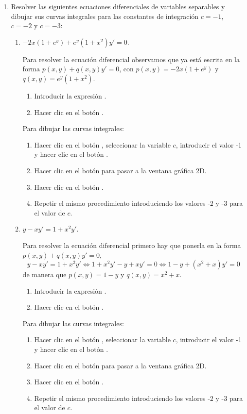 \begin{enumerate}[leftmargin=*]
\item Resolver las siguientes ecuaciones diferenciales de variables separables y dibujar sus curvas integrales para las
constantes de integración $c=-1$, $c=-2$ y $c=-3$:
\begin{enumerate}
\item $-2x(1+e^y)+e^y(1+x^{2})y'=0$.
\begin{indicacion}
Para resolver la ecuación diferencial observamos que ya está escrita en la forma $p(x,y)+q(x,y)y'=0$, con $p(x,y)=-2x(1+e^y)$ y
$q(x,y)=e^y(1+x^{2})$.
\begin{enumerate}
\item Introducir la expresión .
\item Hacer clic en el botón .
\end{enumerate}
Para dibujar las curvas integrales:
\begin{enumerate}[resume]
\item Hacer clic en el botón , seleccionar la variable $c$, introducir el valor -1 y hacer clic en el
botón .
\item Hacer clic en el botón  para pasar a la ventana gráfica 2D.
\item Hacer clic en el botón .
\item Repetir el mismo procedimiento introduciendo los valores -2 y -3 para el valor de $c$.
\end{enumerate}
\end{indicacion}

\item $y-xy'=1+x^2y'$.
\begin{indicacion}
Para resolver la ecuación diferencial primero hay que ponerla en la forma $p(x,y)+q(x,y)y'=0$,
\[
y-xy'=1+x^2y' \Leftrightarrow 1+x^2y'-y+xy'=0 \Leftrightarrow 1-y+(x^2+x)y'=0
\]
de manera que $p(x,y)=1-y$ y $q(x,y)=x^2+x$.
\begin{enumerate}
\item Introducir la expresión .
\item Hacer clic en el botón .
\end{enumerate}
Para dibujar las curvas integrales:
\begin{enumerate}[resume]
\item Hacer clic en el botón , seleccionar la variable $c$, introducir el valor -1 y hacer clic en el
botón .
\item Hacer clic en el botón  para pasar a la ventana gráfica 2D.
\item Hacer clic en el botón .
\item Repetir el mismo procedimiento introduciendo los valores -2 y -3 para el valor de $c$.
\end{enumerate}
\end{indicacion}
\end{enumerate}



\end{enumerate}

